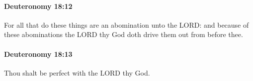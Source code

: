 		\paragraph{Deuteronomy 18:12} %
			\label{DEUTERONOMY-18-12}

			For all that do these things are an abomination unto the LORD: and because of these abominations the LORD thy God doth drive them out from before thee.


		\paragraph{Deuteronomy 18:13} %
			\label{DEUTERONOMY-18-13}

			Thou shalt be perfect with the LORD thy God.


